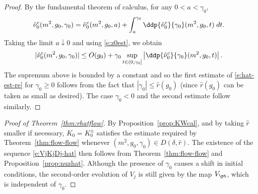 \begin{proof}
By the fundamental theorem of calculus, for any $0 < a < \gamma_0$,
\begin{equation}
\hat\nu_0^c(m^2, g_0, \gamma_0)
  =
\hat\nu_0^c(m^2, g_0, a)
  +
\int_a^{\gamma_0} \ddp{\hat\nu_0^c}{\gamma_0} (m^2, g_0, t) \; dt.
\end{equation}
Taking the limit $a\downarrow 0$ and using \eqref{e:z0est}, we obtain
\begin{equation}
|\hat\nu_0^c(m^2, g_0, \gamma_0)|
  \leq
O(g_0)
  +
\gamma_0
\sup_{t \in (0, \gamma_0]}
\left|\ddp{\hat\nu_0^c}{\gamma_0}(m^2, g_0, t)\right|.
\end{equation}
The supremum above is bounded by a constant and so
the first estimate of \eqref{e:hat-est-re} for $\gamma_0 \geq 0$
follows from the fact that $|\gamma_0| \leq \hat r(g_0)$
(since $\hat r(g_0)$ can be taken as small as desired).
The case $\gamma_0 < 0$ and the second estimate follow similarly.
\end{proof}

\begin{proof}[Proof of Theorem~\ref{thm:rhatflow}]
By Proposition~\ref{prop:KWcal},
and by taking $\hat r$ smaller if necessary,
$K_0 = K^\pm_0$ satisfies the estimate required by Theorem~\ref{thm:flow-flow}
whenever $(m^2, g_0, \gamma_0) \in D(\delta, \hat r)$. The
existence of the sequence \eqref{e:VjKjDj-hat} then follows from
Theorem~\ref{thm:flow-flow} and Proposition~\ref{prop:nuzhat}.
Although the presence of $\gamma_0$ causes a shift in initial
conditions, the second-order evolution of $V_j$ is still given by the map
$V_\pt$,
which is independent of $\gamma_0$.
\end{proof}

